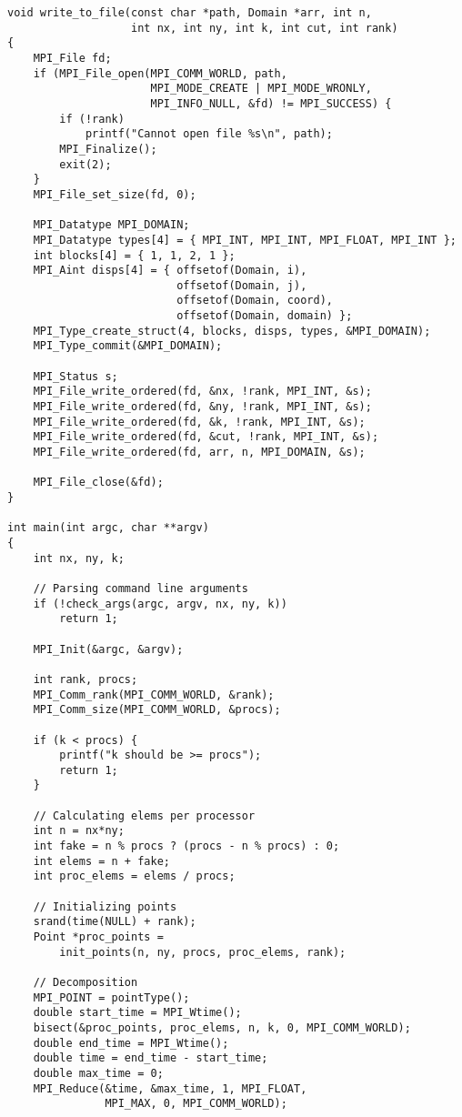 \documentclass[oneside,final,14pt]{extreport}
\begin{document}
\begin{verbatim}
void write_to_file(const char *path, Domain *arr, int n,
                   int nx, int ny, int k, int cut, int rank)
{
    MPI_File fd;
    if (MPI_File_open(MPI_COMM_WORLD, path,
                      MPI_MODE_CREATE | MPI_MODE_WRONLY,
                      MPI_INFO_NULL, &fd) != MPI_SUCCESS) {
        if (!rank)
            printf("Cannot open file %s\n", path);
        MPI_Finalize();
        exit(2);
    }
    MPI_File_set_size(fd, 0);

    MPI_Datatype MPI_DOMAIN;
    MPI_Datatype types[4] = { MPI_INT, MPI_INT, MPI_FLOAT, MPI_INT };
    int blocks[4] = { 1, 1, 2, 1 };
    MPI_Aint disps[4] = { offsetof(Domain, i),
                          offsetof(Domain, j),
                          offsetof(Domain, coord),
                          offsetof(Domain, domain) };
    MPI_Type_create_struct(4, blocks, disps, types, &MPI_DOMAIN);
    MPI_Type_commit(&MPI_DOMAIN);

    MPI_Status s;
    MPI_File_write_ordered(fd, &nx, !rank, MPI_INT, &s);
    MPI_File_write_ordered(fd, &ny, !rank, MPI_INT, &s);
    MPI_File_write_ordered(fd, &k, !rank, MPI_INT, &s);
    MPI_File_write_ordered(fd, &cut, !rank, MPI_INT, &s);
    MPI_File_write_ordered(fd, arr, n, MPI_DOMAIN, &s);

    MPI_File_close(&fd);
}

int main(int argc, char **argv)
{
    int nx, ny, k;

    // Parsing command line arguments
    if (!check_args(argc, argv, nx, ny, k))
        return 1;

    MPI_Init(&argc, &argv);

    int rank, procs;
    MPI_Comm_rank(MPI_COMM_WORLD, &rank);
    MPI_Comm_size(MPI_COMM_WORLD, &procs);

    if (k < procs) {
        printf("k should be >= procs");
        return 1;
    }

    // Calculating elems per processor
    int n = nx*ny;
    int fake = n % procs ? (procs - n % procs) : 0;
    int elems = n + fake;
    int proc_elems = elems / procs;

    // Initializing points
    srand(time(NULL) + rank);
    Point *proc_points =
        init_points(n, ny, procs, proc_elems, rank);

    // Decomposition
    MPI_POINT = pointType();
    double start_time = MPI_Wtime();
    bisect(&proc_points, proc_elems, n, k, 0, MPI_COMM_WORLD);
    double end_time = MPI_Wtime();
    double time = end_time - start_time;
    double max_time = 0;
    MPI_Reduce(&time, &max_time, 1, MPI_FLOAT,
               MPI_MAX, 0, MPI_COMM_WORLD);


\end{verbatim}
\end{document}
